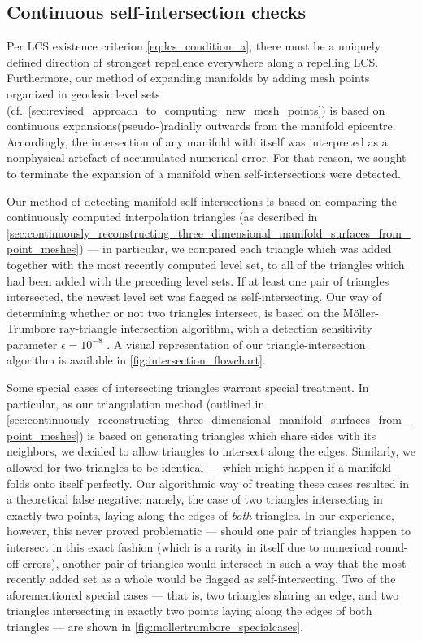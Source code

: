 \subsection{Continuous self-intersection checks}
\label{sub:continuous_self_intersection_checks}

Per LCS existence criterion \eqref{eq:lcs_condition_a}, there must be a uniquely
defined direction of strongest repellence everywhere along a repelling LCS.
Furthermore, our method of expanding manifolds by adding mesh points organized
in geodesic level sets (cf.\
\cref{sec:revised_approach_to_computing_new_mesh_points}) is based on
continuous expansions(pseudo-)radially outwards from the manifold epicentre.
Accordingly, the intersection of any manifold with itself was interpreted as
a nonphysical artefact of accumulated numerical error. For that reason, we
sought to terminate the expansion of a manifold when self-intersections
were detected.

Our method of detecting manifold self-intersections is based on comparing the
continuously computed interpolation triangles (as described in
\cref{sec:continuously_reconstructing_three_dimensional_manifold_surfaces_from_point_meshes})
--- in particular, we compared each triangle which was added together with the
most recently computed level set, to all of the triangles which had been
added with the preceding level sets. If at least one pair of triangles
intersected, the newest level set was flagged as self-intersecting. Our way
of determining whether or not two triangles intersect, is based on
the Möller-Trumbore ray-triangle intersection algorithm, with a detection
sensitivity parameter $\epsilon=10^{-8}$ \parencite{moller1997fast}. A visual
representation of our triangle-intersection algorithm is available in
\cref{fig:intersection_flowchart}.



Some special cases of intersecting triangles warrant special treatment.
In particular, as our triangulation method (outlined in
\cref{sec:continuously_reconstructing_three_dimensional_manifold_surfaces_from_point_meshes})
is based on generating triangles which share sides with its neighbors, we
decided to allow triangles to intersect along the edges. Similarly, we allowed
for two triangles to be identical --- which might happen if a manifold
folds onto itself perfectly. Our algorithmic way of treating these cases
resulted in a theoretical false negative; namely, the case of two triangles
intersecting in exactly two points, laying along the edges of \emph{both}
triangles. In our experience, however, this never proved problematic ---
should one pair of triangles happen to intersect in this exact fashion
(which is a rarity in itself due to numerical round-off errors), another
pair of triangles would intersect in such a way that the most recently added
set as a whole would be flagged as self-intersecting. Two of the aforementioned
special cases --- that is, two triangles sharing an edge, and two triangles
intersecting in exactly two points laying along the edges of both triangles ---
are shown in \cref{fig:mollertrumbore_specialcases}.

